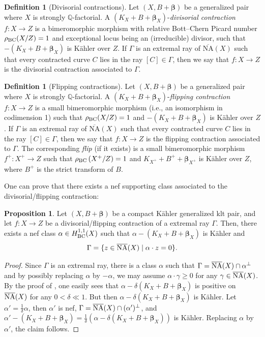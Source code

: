 \documentclass[11pt]{amsart}
\numberwithin{equation}{section}
\def\bbeta{\boldsymbol{\beta}}
\newcommand\Q{{\mathbb{Q}}}
\theoremstyle{definition}
\theoremstyle{definition}
\newtheorem{proposition}[theorem]{Proposition}
\theoremstyle{definition}
\newtheorem{definition}[theorem]{Definition}
\begin{document}
\begin{definition}[Divisorial contractions]
Let $(X,B+\boldsymbol{\beta})$ be a generalized pair where $X$ is strongly $\Q$-factorial.
A $(K_X+B+\boldsymbol{\beta}_X)$-\emph{divisorial contraction} $f:X\to Z$ is a bimeromorphic morphism with relative Bott--Chern Picard number $\rho_{\rm{BC}}(X/Z)= 1$ and exceptional locus being an (irreducible) divisor, such that $-(K_X+B+ \boldsymbol{\beta}_X)$ is K\"ahler over $Z$. If $\Gamma$ is an extremal ray of $\overline{\text{NA}}(X)$ such that every contracted curve $C$ lies in the ray $[C]\in \Gamma$, then we say that $f:X\to Z$ is the divisorial contraction associated to $\Gamma$.
\end{definition}

\begin{definition}[Flipping contractions]
Let $(X,B+\boldsymbol{\beta})$ be a generalized pair where $X$ is strongly $\Q$-factorial.
A $(K_X+B+\boldsymbol{\beta}_X)$-\emph{flipping contraction} $f: X \rightarrow Z$ is a small bimeromorphic morphism (i.e., an isomorphism in codimension 1) such that $\rho_{\rm{BC}}(X / Z)=1$ and $-\left(K_X+B+ { \boldsymbol{\beta}}_X\right)$ is K\"ahler over $Z$. If $\Gamma$ is an extremal ray of $\overline{\text{NA}}(X)$ such that every contracted curve $C$ lies in the ray $[C]\in \Gamma$, then we say that $f:X\to Z$ is the flipping contraction associated to $\Gamma$. The corresponding \emph{flip} (if it exists) is a small bimeromorphic morphism $f^{+}: X^{+} \rightarrow Z$ such that $\rho_{\rm{BC}}\left(X^{+} / Z\right)=1$ and $K_{X^{+}}+B^{+}+ \boldsymbol{\beta}_{X^{+}}$ is  K\"ahler over $Z$, where $B^{+}$ is the strict transform of $B$.
\end{definition}

 One can prove that there exists a nef supporting class associated to the divisorial/flipping contraction:

\begin{proposition}\label{p-nefsupp}
Let $(X,B+ \bbeta)$ be a compact K\"ahler generalized  klt pair, and let $f:X\to Z$ be a divisorial/flipping contraction of a extremal ray $\Gamma$. Then, there exists a nef class $\alpha \in H^{1,1}_{\rm{BC}}(X)$ such that $\alpha-(K_X+B+\bbeta _X)$ is K\"ahler and
$$
\Gamma=\{z \in \overline{\rm NA}(X) \mid \alpha \cdot z=0\}.
$$
\end{proposition}
\begin{proof}
Since $\Gamma$ is an extremal ray, there is a class $\alpha$ such that $\Gamma =\overline{\rm NA}(X)\cap \alpha ^\perp$ and by possibly replacing $\alpha$ by $-\alpha$, we may assume $\alpha\cdot \gamma\geq 0$ for any $\gamma\in \overline{\rm NA}(X)$. By the proof of \cite[Claim 3.23]{DHY23}, one easily sees that $\alpha -\delta (K_X+B+\bbeta _X)$ is positive on $\overline{\rm NA}(X)$ for any $0<\delta \ll 1$. But then $\alpha -\delta (K_X+B+\bbeta _X)$ is K\"ahler. 
Let $\alpha '=\frac 1 \delta \alpha$, then $\alpha '$ is nef, $\Gamma =\overline{\rm NA}(X)\cap (\alpha') ^\perp$, and 
$\alpha'-(K_X+B+\bbeta _X)=\frac 1\delta(\alpha -\delta(K_X+B+\bbeta _X))$ is K\"ahler.
Replacing $\alpha$ by $\alpha'$, the claim follows.
\end{proof}
\end{document}
